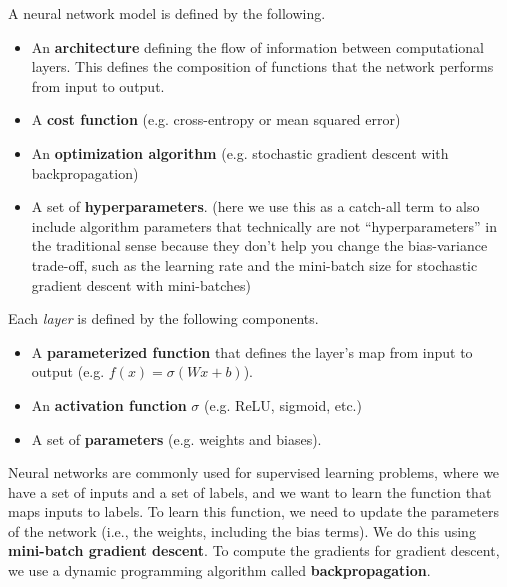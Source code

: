 \documentclass{article}
\begin{document}
A neural network model is defined by the following.
    \begin{itemize}
        \item An \textbf{architecture} defining the flow of information between computational layers. This defines the composition of functions that the network performs from input to output.

        \item A \textbf{cost function} (e.g. cross-entropy or mean squared error)

        \item An \textbf{optimization algorithm} (e.g. stochastic gradient descent with backpropagation)

        \item A set of \textbf{hyperparameters}. (here we use this as a catch-all term to also include algorithm parameters that technically are not ``hyperparameters'' in the traditional sense because they don't help you change the bias-variance trade-off, such as the learning rate and the mini-batch size for stochastic gradient descent with mini-batches)
    \end{itemize}
Each \textit{layer} is defined by the following components.
    \begin{itemize}
        \item A \textbf{parameterized function} that defines the layer's map from input to output (e.g. $f(x) = \sigma(Wx + b)$).

        \item An \textbf{activation function} $\sigma$ (e.g. ReLU, sigmoid, etc.)

        \item A set of \textbf{parameters} (e.g. weights and biases).
    \end{itemize}
Neural networks are commonly used for supervised learning problems, where we have a set of inputs and a set of labels, and we want to learn the function that maps inputs to labels. To learn this function, we need to update the parameters of the network (i.e., the weights, including the bias terms). We do this using \textbf{mini-batch gradient descent}. To compute the gradients for gradient descent, we use a dynamic programming algorithm called \textbf{backpropagation}.
\end{document}
